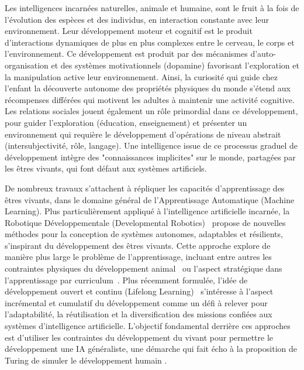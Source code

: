 Les intelligences incarnées naturelles, animale et humaine, sont le fruit à la fois de l'évolution des espèces et des individus, en interaction constante avec leur environnement.
Leur développement moteur et cognitif est le produit d'interactions dynamiques de plus en plus complexes entre le cerveau, le corps et l'environnement.
Ce développement est produit par des mécanismes d'auto-organisation \cite{oudeyer2012developmental} et des systèmes motivationnels (dopamine) favorisant l'exploration et la manipulation active leur environnement.
Ainsi, la curiosité qui guide chez l'enfant la découverte autonome des propriétés physiques du monde s'étend aux récompenses différées qui motivent les adultes à maintenir une activité cognitive.
Les relations sociales jouent également un rôle primordial dans ce développement, pour guider l'exploration (éducation, enseignement) et présenter un environnement qui requière le développement d'opérations de niveau abstrait (intersubjectivité, rôle, langage).
Une intelligence issue de ce processus graduel de développement intègre des "connaissances implicites" sur le monde, partagées par les êtres vivants, qui font défaut aux systèmes artificiels. 

De nombreux travaux s'attachent à répliquer les capacités d'apprentissage des êtres vivants, dans le domaine général de l'Apprentissage Automatique (Machine Learning).
Plus particulièrement appliqué à l'intelligence artificielle incarnée, la Robotique Développementale (Developmental Robotics)~\cite{oudeyer2012developmental} propose de nouvelles méthodes pour la conception de systèmes autonomes, adaptables et résilients, s'inspirant du développement des êtres vivants.
Cette approche explore de manière plus large le problème de l'apprentissage, incluant entre autres les contraintes physiques du développement animal~\cite{lungarella2002interplay} ou l'aspect stratégique dans l'apprentissage par curriculum~\cite{bengio2009curriculum}.
Plus récemment formulée, l'idée de développement ouvert et continu (Lifelong Learning)~\cite{Oztop2020} s'intéresse à l'aspect incrémental et cumulatif du développement comme un défi à relever pour l'adaptabilité, la réutilisation et la diversification des missions confiées aux systèmes d'intelligence artificielle.
L'objectif fondamental derrière ces approches est d'utiliser les contraintes du développement du vivant pour permettre le développement une IA généraliste, une démarche qui fait écho à la proposition de Turing de simuler le développement humain \cite{turing2009computing}.

